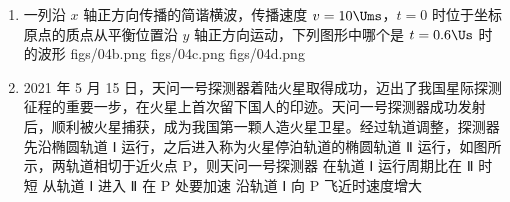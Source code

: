 \documentclass[\gkver]{gaokaozhenti}
\begin{document}
\begin{enumerate}
{$T=\frac{2\pi}{\omega}=\frac{2\pi}{10\pi}\Us=0.2\Us$

B．电压表的读数为交流电的有效值，即

$U=\frac{50\sqrt{2}}{\sqrt{2}}\UV=50\UV$，选项 B 错误；

C．电流表的读数为

$I=\frac{U}{R}=\frac{50}{5}\UA=10\UA$，选项 C 正确；

D．电阻的电功率为

$P = IU = 10 \times 50\UW = 500\UW$，选项 D 错误。

故选 C。
}

\item
一列沿 $x$ 轴正方向传播的简谐横波，传播速度 $v = 10 \Ums$，$t = 0$ 时位于坐标原点的质点从平衡位置沿 $y$ 轴正方向运动，下列图形中哪个是 $t = 0.6 \Us$ 时的波形 
{figs/04b.png}
{figs/04c.png}
{figs/04d.png}


\item
2021 年 5 月 15 日，天问一号探测器着陆火星取得成功，迈出了我国星际探测征程的重要一步，在火星上首次留下国人的印迹。天问一号探测器成功发射后，顺利被火星捕获，成为我国第一颗人造火星卫星。经过轨道调整，探测器先沿椭圆轨道 Ⅰ 运行，之后进入称为火星停泊轨道的椭圆轨道 Ⅱ 运行，如图所示，两轨道相切于近火点 P，则天问一号探测器 
{在轨道 Ⅰ 运行周期比在 Ⅱ 时短}
{从轨道 Ⅰ 进入 Ⅱ 在 P 处要加速}
{沿轨道 Ⅰ 向 P 飞近时速度增大}

\end{enumerate}
\end{document}
